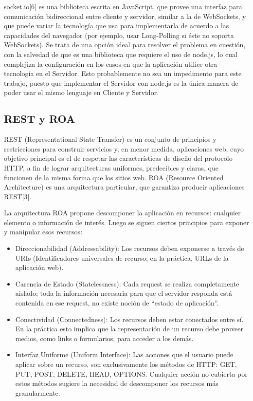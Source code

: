 \documentclass[doc,helv,longtable]{article}
\begin{document}
socket.io[6] es una biblioteca escrita en JavaScript, que provee una interfaz para comunicación bidireccional entre cliente y servidor, similar a la de WebSockets, y que puede variar la tecnología que usa para implementarla de acuerdo a las capacidades del navegador (por ejemplo, usar Long-Polling si éste no soporta WebSockets). Se trata de una opción ideal para resolver el problema en cuestión, con la salvedad de que es una biblioteca que requiere el uso de node.js, lo cual complejiza la configuración en los casos en que la aplicación utilice otra tecnología en el Servidor. Esto probablemente no sea un impedimento para este trabajo, puesto que implementar el Servidor con node.js es la única manera de poder usar el mismo lenguaje en Cliente y Servidor.\subsection{REST y ROA}


REST (Representational State Transfer) es un conjunto de principios y restricciones para construir servicios y, en menor medida, aplicaciones web, cuyo objetivo principal es el de respetar las características de diseño del protocolo HTTP, a fin de lograr arquitecturas uniformes, predecibles y claras, que funcionen de la misma forma que los sitios web. ROA (Resource Oriented Architecture) es una arquitectura particular, que garantiza producir aplicaciones REST[3].

La arquitectura ROA propone descomponer la aplicación en recursos: cualquier elemento o información de interés. Luego se siguen ciertos principios para exponer y manipular esos recursos:
\begin{itemize}
\item  Direccionabilidad (Addressability): Los recursos deben exponerse a través de URIs (Identificadores universales de recurso; en la práctica, URLs de la aplicación web).
\item  Carencia de Estado (Statelessness): Cada request se realiza completamente aislado; toda la información necesaria para que el servidor responda está contenida en ese request, no existe noción de “estado de aplicación”.
\item  Conectividad (Connectedness): Los recursos deben estar conectados entre sí. En la práctica esto implica que la representación de un recurso debe proveer medios, como links o formularios, para acceder a los demás.
\item  Interfaz Uniforme (Uniform Interface): Las acciones que el usuario puede aplicar sobre un recurso, son exclusivamente los métodos de HTTP: GET, PUT, POST, DELETE, HEAD, OPTIONS. Cualquier acción no cubierta por estos métodos sugiere la necesidad de descomponer los recursos más granularmente.

\end{itemize}
\end{document}

